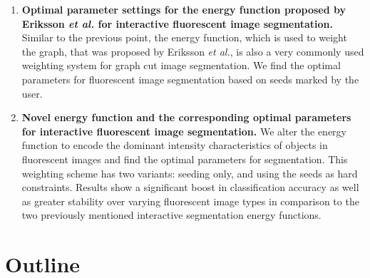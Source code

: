 \begin{enumerate}
	\item
	\textbf{Optimal parameter settings for the energy function proposed by Eriksson \textit{et al.} \citep{Eriksson2006} for interactive fluorescent image segmentation.}
	Similar to the previous point, the energy function, which is used to weight the graph, that was proposed by  Eriksson \textit{et al.}, is also a very commonly used weighting system for graph cut image segmentation. We find the optimal parameters for fluorescent image segmentation based on seeds marked by the user.
	
	\item
	\textbf{Novel energy function and the corresponding optimal parameters for interactive fluorescent image segmentation.}
	We alter the energy function to encode the dominant intensity characteristics of objects in fluorescent images and find the optimal parameters for segmentation. This weighting scheme has two variants: seeding only, and using the seeds as hard constraints. Results show a significant boost in classification accuracy as well as greater stability over varying fluorescent image types in comparison to the two previously mentioned interactive segmentation energy functions. 
\end{enumerate}


\section{Outline}


